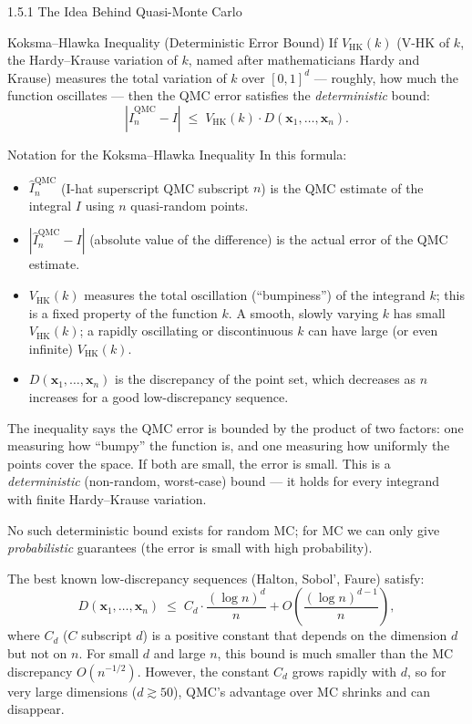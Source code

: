 \documentclass[aspectratio=169,10pt]{beamer}
\begin{document}
\begin{frame}[allowframebreaks]{1.5.1 The Idea Behind Quasi-Monte Carlo}
  \framebreak

  \begin{block}{Koksma--Hlawka Inequality (Deterministic Error Bound)}
    If $V_{\mathrm{HK}}(k)$ (V-HK of $k$, the Hardy--Krause variation of $k$,
    named after mathematicians Hardy and Krause) measures the total variation of
    $k$ over $[0,1]^d$ --- roughly, how much the function oscillates --- then
    the QMC error satisfies the \emph{deterministic} bound:
    \[
      \left|\hat{I}_n^{\mathrm{QMC}} - I\right|
      \;\le\; V_{\mathrm{HK}}(k) \cdot D(\mathbf{x}_1, \ldots, \mathbf{x}_n).
    \]
  \end{block}

  \begin{block}{Notation for the Koksma--Hlawka Inequality}
    In this formula:
    \begin{itemize}
      \item $\hat{I}_n^{\mathrm{QMC}}$ (I-hat superscript QMC subscript $n$)
        is the QMC estimate of the integral $I$ using $n$ quasi-random points.
      \item $\left|\hat{I}_n^{\mathrm{QMC}} - I\right|$ (absolute value of the
        difference) is the actual error of the QMC estimate.
      \item $V_{\mathrm{HK}}(k)$ measures the total oscillation (``bumpiness'')
        of the integrand $k$; this is a fixed property of the function $k$.  A
        smooth, slowly varying $k$ has small $V_{\mathrm{HK}}(k)$; a rapidly
        oscillating or discontinuous $k$ can have large (or even infinite)
        $V_{\mathrm{HK}}(k)$.
      \item $D(\mathbf{x}_1, \ldots, \mathbf{x}_n)$ is the discrepancy of the
        point set, which decreases as $n$ increases for a good low-discrepancy
        sequence.
    \end{itemize}
    The inequality says the QMC error is bounded by the product of two factors:
    one measuring how ``bumpy'' the function is, and one measuring how uniformly
    the points cover the space.  If both are small, the error is small.  This
    is a \emph{deterministic} (non-random, worst-case) bound --- it holds for
    every integrand with finite Hardy--Krause variation.
  \end{block}

  No such deterministic bound exists for random MC; for MC we can only give
  \emph{probabilistic} guarantees (the error is small with high probability).

  The best known low-discrepancy sequences (Halton, Sobol', Faure) satisfy:
  \[
    D(\mathbf{x}_1, \ldots, \mathbf{x}_n)
    \;\le\; C_d \cdot \frac{(\log n)^d}{n}
    + O\!\left(\frac{(\log n)^{d-1}}{n}\right),
  \]
  where $C_d$ ($C$ subscript $d$) is a positive constant that depends on the
  dimension $d$ but not on $n$.  For small $d$ and large $n$, this bound is
  much smaller than the MC discrepancy $O(n^{-1/2})$.  However, the constant
  $C_d$ grows rapidly with $d$, so for very large dimensions ($d \gtrsim 50$),
  QMC's advantage over MC shrinks and can disappear.


\end{frame}
\end{document}
